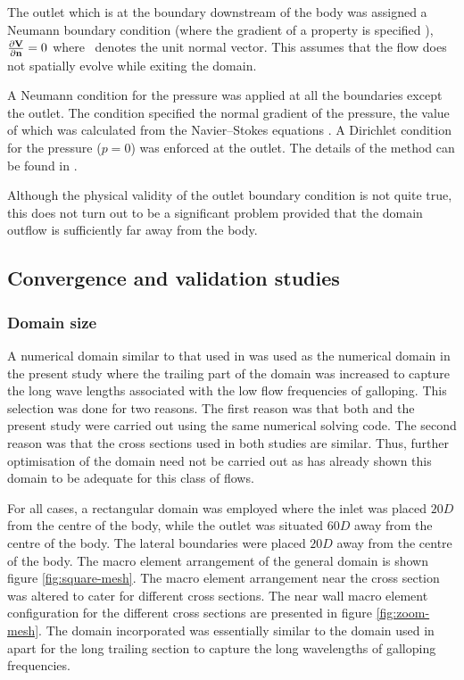 The outlet which is at the boundary downstream of the body was assigned a Neumann boundary condition (where the gradient of a property is specified \citet{tu2007}), $\frac{\partial\mathbf{V}}{\partial\mathbf{n}}=0$ where \normal\ denotes the unit normal vector. This assumes that the flow does not spatially evolve while exiting the domain.


A Neumann condition for the pressure was applied at all the boundaries except the outlet. The condition specified the normal gradient of the pressure, the value of which was calculated from the Navier--Stokes equations \citep{gresho1987}. A Dirichlet condition for the pressure ($p=0$) was enforced at the outlet. The details of the method can be found in \citet{Thompson2006,Thompson1996a}.

 Although the physical validity of the outlet boundary condition is not quite true, this does not turn out to be a significant problem provided that the domain outflow is sufficiently far away from the body.

 
\subsection{Convergence and validation studies}

\subsubsection{Domain size}

A numerical domain similar to that used in \citet{Leontini2013} was used  as the numerical domain in the present study where the trailing part of the domain was increased to capture the long wave lengths associated with the low flow frequencies of galloping. This selection was done for two reasons. The first reason was that both  \citet{Leontini2013} and the present study were carried out using the same numerical solving code. The second reason was that the cross sections used in both studies are similar. Thus, further optimisation of the domain need not be carried out as \citet{Leontini2013} has already shown this domain to be adequate for this class of flows.

For all cases, a rectangular domain was employed where the inlet was placed $20D$ from the centre of the body, while the outlet was situated $60D$ away from the centre of the body. The lateral boundaries were placed $20D$ away from the centre of the body. The macro element arrangement of the general domain is shown figure \ref{fig:square-mesh}. The macro element arrangement near the cross section was altered to cater for different cross sections. The near wall macro element configuration for the different cross sections are presented in figure \ref{fig:zoom-mesh}. The domain incorporated was essentially similar to the domain used in \citet{Leontini2013} apart for the long trailing section to capture the long wavelengths of galloping frequencies. 
 
